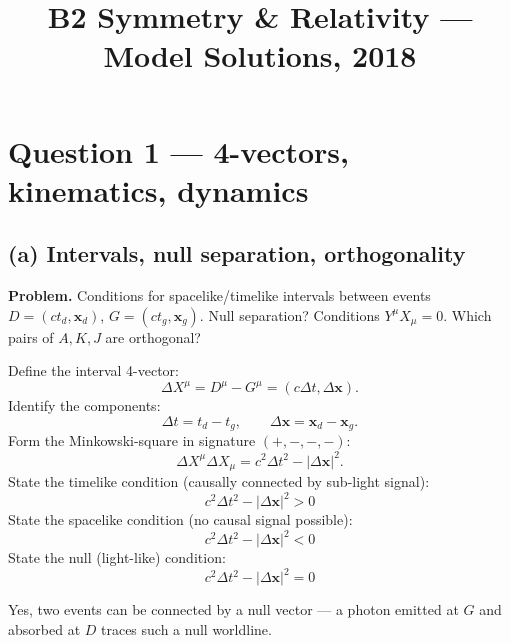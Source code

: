 \documentclass[11pt]{article}
\title{B2 Symmetry \& Relativity --- Model Solutions, 2018}
\author{}
\date{}
\begin{document}
\maketitle

\section*{Question 1 --- 4-vectors, kinematics, dynamics}

\subsection*{(a) Intervals, null separation, orthogonality}

\textbf{Problem.} Conditions for spacelike/timelike intervals between events $D=(ct_d,\bm x_d)$, $G=(ct_g,\bm x_g)$. Null separation? Conditions $Y^\mu X_\mu=0$. Which pairs of $A,K,J$ are orthogonal?

Define the interval 4-vector:
\[ \Delta X^\mu = D^\mu - G^\mu = (c\Delta t,\Delta\bm x). \]
Identify the components:
\[ \Delta t = t_d-t_g,\qquad \Delta\bm x=\bm x_d-\bm x_g. \]
Form the Minkowski-square in signature $(+,-,-,-)$:
\[ \Delta X^\mu \Delta X_\mu = c^2\Delta t^2 - |\Delta\bm x|^2. \]
State the timelike condition (causally connected by sub-light signal):
\[ \boxed{\;c^2\Delta t^2 - |\Delta\bm x|^2 > 0\;} \]
State the spacelike condition (no causal signal possible):
\[ \boxed{\;c^2\Delta t^2 - |\Delta\bm x|^2 < 0\;} \]
State the null (light-like) condition:
\[ \boxed{\;c^2\Delta t^2 - |\Delta\bm x|^2 = 0\;} \]

\noindent Yes, two events can be connected by a null vector --- a photon emitted at $G$ and absorbed at $D$ traces such a null worldline.

\begin{center}
\end{center}
\end{document}
